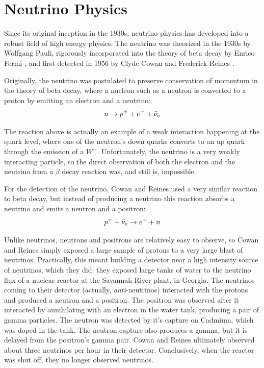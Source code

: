 \chapter{\label{chp:intro} Neutrino Physics}


Since its original inception in the 1930s, neutrino physics has developed into a robust field of high energy physics.  The neutrino was theorized in the 1930s by Wolfgang Pauli, rigorously incorporated into the theory of beta decay by Enrico Fermi \cite{Fermi}, and first detected in 1956 by Clyde Cowan and Frederick Reines \cite{Cowan:1992xc}.

Originally, the neutrino was postulated to preserve conservation of momentum in the theory of beta decay, where a nucleon such as a neutron is converted to a proton by emitting an electron and a neutrino:
\begin{equation}
\label{beta_decay}
n \rightarrow p^+ + e^- + \bar\nu_{e}
\end{equation}

The reaction above is actually an example of a weak interaction happening at the quark level, where one of the neutron's down quarks converts to an up quark through the emission of a $W^-$.  Unfortunately, the neutrino is a very weakly interacting particle, so the direct observation of both the electron and the neutrino from a $\beta$ decay reaction was, and still is, impossible.  

For the detection of the neutrino, Cowan and Reines used a very similar reaction to beta decay, but instead of producing a neutrino this reaction absorbs a neutrino and emits a neutron and a positron:
\begin{equation}
\label{inverse_beta_decay}
p^+  + \bar\nu_{e} \rightarrow e^- + n 
\end{equation}

Unlike neutrinos, neutrons and positrons are relatively easy to observe, so Cowan and Reines simply exposed a large sample of protons to a very large blast of neutrinos.  Practically, this meant building a detector near a high intensity source of neutrinos, which they did: they exposed large tanks of water to the neutrino flux of a nuclear reactor at the Savannah River plant, in Georgia.  The neutrinos coming to their detector (actually, {\em anti}-neutrinos) interacted with the protons and produced a neutron and a positron.  The positron was observed after it interacted by annihilating with an electron in the water tank, producing a pair of gamma particles.  The neutron was detected by it's capture on Cadmium, which was doped in the tank.  The neutron capture also produces a gamma, but it is delayed from the positron's gamma pair.  Cowan and Reines ultimately observed about three neutrinos per hour in their detector.  Conclusively, when the reactor was shut off, they no longer observed neutrinos. 

